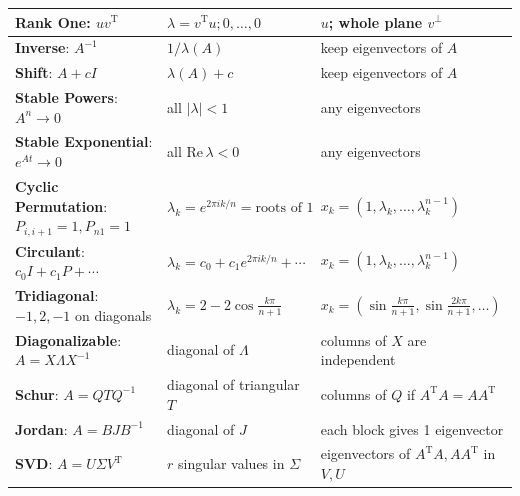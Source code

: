 \documentclass[14pt, a4paper]{article}
\begin{document}
\begin{tabular}{|l|l|l|}
    \textbf{Rank One}: $uv^{\mathrm{T}}$                               & $\lambda = v^{\mathrm{T}}u; 0, \dots, 0$        & $u$; whole plane $v^{\perp}$                                               \\ \hline
    \textbf{Inverse}: $A^{-1}$                                         & $1/\lambda(A)$                                  & keep eigenvectors of $A$                                                   \\ \hline
    \textbf{Shift}: $A + cI$                                           & $\lambda(A) + c$                                & keep eigenvectors of $A$                                                   \\ \hline
    \textbf{Stable Powers}: $A^n \to 0$                                & all $|\lambda| < 1$                             & any eigenvectors                                                           \\ \hline
    \textbf{Stable Exponential}: $e^{At} \to 0$                        & all $\mathrm{Re}\, \lambda < 0$                 & any eigenvectors                                                           \\ \hline
    \textbf{Cyclic Permutation}: $P_{i,i+1} = 1, P_{n1} = 1$           & $\lambda_k = e^{2\pi ik/n} = \text{roots of 1}$ & $x_k = (1, \lambda_k, \dots, \lambda_k^{n-1})$                             \\ \hline
    \textbf{Circulant}: $c_0I + c_1P + \cdots$                         & $\lambda_k = c_0 + c_1 e^{2\pi ik/n} + \cdots$  & $x_k = (1, \lambda_k, \dots, \lambda_k^{n-1})$                             \\ \hline
    \textbf{Tridiagonal}: $-1, 2, -1$ on diagonals                     & $\lambda_k = 2 - 2 \cos \frac{k\pi}{n+1}$       & $x_k = \left(\sin \frac{k\pi}{n+1}, \sin \frac{2k\pi}{n+1}, \dots \right)$ \\ \hline
    \textbf{Diagonalizable}: $A = X\Lambda X^{-1}$                     & diagonal of $\Lambda$                           & columns of $X$ are independent                                             \\ \hline
    \textbf{Schur}: $A = QTQ^{-1}$                                     & diagonal of triangular $T$                      & columns of $Q$ if $A^{\mathrm{T}}A = AA^{\mathrm{T}}$                      \\ \hline
    \textbf{Jordan}: $A = BJB^{-1}$                                    & diagonal of $J$                                 & each block gives 1 eigenvector                                             \\ \hline
    \textbf{SVD}: $A = U\Sigma V^{\mathrm{T}}$                         & $r$ singular values in $\Sigma$                 & eigenvectors of $A^{\mathrm{T}}A, AA^{\mathrm{T}}$ in $V, U$               \\ \hline
\end{tabular}
\end{document}
